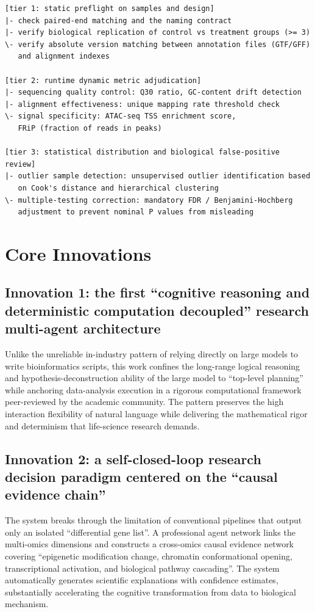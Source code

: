 \documentclass[11pt,a4paper]{article}
\begin{document}
\begin{verbatim}
[tier 1: static preflight on samples and design]
|- check paired-end matching and the naming contract
|- verify biological replication of control vs treatment groups (>= 3)
\- verify absolute version matching between annotation files (GTF/GFF)
   and alignment indexes

[tier 2: runtime dynamic metric adjudication]
|- sequencing quality control: Q30 ratio, GC-content drift detection
|- alignment effectiveness: unique mapping rate threshold check
\- signal specificity: ATAC-seq TSS enrichment score,
   FRiP (fraction of reads in peaks)

[tier 3: statistical distribution and biological false-positive review]
|- outlier sample detection: unsupervised outlier identification based
   on Cook's distance and hierarchical clustering
\- multiple-testing correction: mandatory FDR / Benjamini-Hochberg
   adjustment to prevent nominal P values from misleading
\end{verbatim}

\section{Core Innovations}

\subsection{Innovation 1: the first ``cognitive reasoning and deterministic computation decoupled'' research multi-agent architecture}

Unlike the unreliable in-industry pattern of relying directly on large models to write bioinformatics scripts, this work confines the long-range logical reasoning and hypothesis-deconstruction ability of the large model to ``top-level planning'' while anchoring data-analysis execution in a rigorous computational framework peer-reviewed by the academic community. The pattern preserves the high interaction flexibility of natural language while delivering the mathematical rigor and determinism that life-science research demands.

\subsection{Innovation 2: a self-closed-loop research decision paradigm centered on the ``causal evidence chain''}

The system breaks through the limitation of conventional pipelines that output only an isolated ``differential gene list''. A professional agent network links the multi-omics dimensions and constructs a cross-omics causal evidence network covering ``epigenetic modification change, chromatin conformational opening, transcriptional activation, and biological pathway cascading''. The system automatically generates scientific explanations with confidence estimates, substantially accelerating the cognitive transformation from data to biological mechanism.
\end{document}
